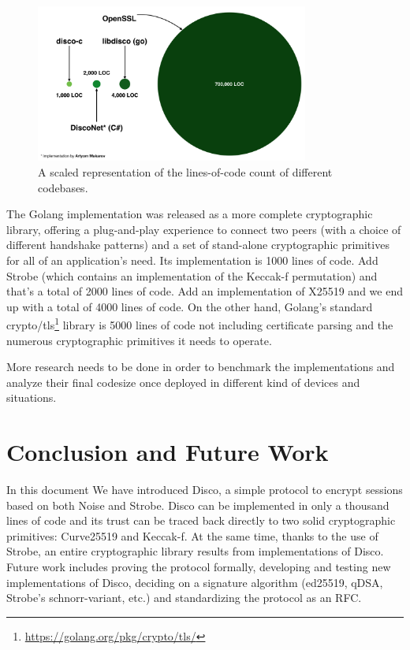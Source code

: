 \documentclass{article}
\begin{document}
\begin{figure}[H]
\centering
\includegraphics[width=0.8\textwidth]{rwcimg/LOC.png}
\caption{A scaled representation of the lines-of-code count of different codebases.}
\label{fig:LOC}
\end{figure}

The Golang implementation was released as a more complete cryptographic library, offering a plug-and-play experience to connect two peers (with a choice of different handshake patterns) and a set of stand-alone cryptographic primitives for all of an application's need. Its implementation is 1000 lines of code. Add  Strobe (which contains an implementation of the Keccak-f permutation) and that's a total of 2000 lines of code. Add an implementation of X25519 and we end up with a total of 4000 lines of code. On the other hand, Golang's standard crypto/tls\footnote{\url{https://golang.org/pkg/crypto/tls/}} library is 5000 lines of code not including certificate parsing and the numerous cryptographic primitives it needs to operate.

More research needs to be done in order to benchmark the implementations and analyze their final codesize once deployed in different kind of devices and situations.

\section{Conclusion and Future Work}

In this document We have introduced Disco, a simple protocol to encrypt sessions based on both Noise and Strobe. Disco can be implemented in only a thousand lines of code and its trust can be traced back directly to two solid cryptographic primitives: Curve25519 and Keccak-f. At the same time, thanks to the use of Strobe, an entire cryptographic library results from implementations of Disco. Future work includes proving the protocol formally, developing and testing new implementations of Disco, deciding on a signature algorithm (ed25519, qDSA, Strobe's schnorr-variant, etc.) and standardizing the protocol as an RFC.
\end{document}
